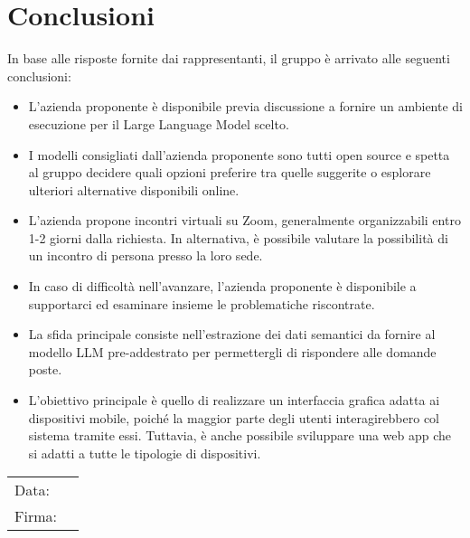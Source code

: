 \documentclass[a4paper, 12pt]{article}
\begin{document}
\section{Conclusioni}
In base alle risposte fornite dai rappresentanti, il gruppo è arrivato alle seguenti conclusioni:
\begin{itemize}
    \item L'azienda proponente è disponibile previa discussione a fornire un ambiente di esecuzione per il Large Language Model scelto.

    \item I modelli consigliati dall’azienda proponente sono tutti open source e spetta al gruppo decidere quali opzioni preferire tra quelle suggerite o esplorare ulteriori alternative disponibili online.
    
    \item L'azienda propone incontri virtuali su Zoom, generalmente organizzabili entro 1-2 giorni dalla richiesta. In alternativa, è possibile valutare la possibilità di un incontro di persona presso la loro sede.
    
    \item In caso di difficoltà nell'avanzare, l'azienda proponente è disponibile a supportarci ed esaminare insieme le problematiche riscontrate.
    
    \item La sfida principale consiste nell'estrazione dei dati semantici da fornire al modello LLM pre-addestrato per permettergli di rispondere alle domande poste.

    \item L’obiettivo principale è quello di realizzare un interfaccia grafica adatta ai dispositivi mobile, poiché la maggior parte degli utenti interagirebbero col sistema tramite essi. Tuttavia, è anche possibile sviluppare una web app che si adatti a tutte le tipologie di dispositivi.
\end{itemize}

\vfill
{\renewcommand{\arraystretch}{2}
\begin{tabular}{l p{5cm}}
    Data: &  \hrulefill \\
    Firma: & \hrulefill \\
\end{tabular}
}
\end{document}
